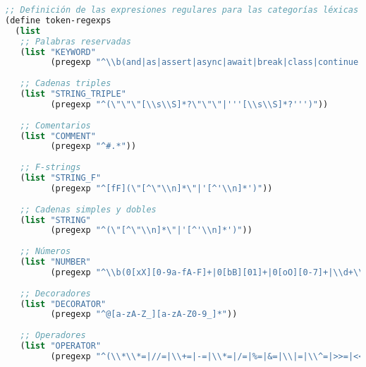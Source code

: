 \documentclass[12pt,letterpaper]{report}
\begin{document}
\begin{lstlisting}[language=Lisp]
;; Definición de las expresiones regulares para las categorías léxicas
(define token-regexps
  (list
   ;; Palabras reservadas
   (list "KEYWORD" 
         (pregexp "^\\b(and|as|assert|async|await|break|class|continue|def|del|elif|else|except|False|finally|for|from|global|if|import|in|is|lambda|None|nonlocal|not|or|pass|raise|return|True|try|while|with|yield)\\b"))
   
   ;; Cadenas triples
   (list "STRING_TRIPLE" 
         (pregexp "^(\"\"\"[\\s\\S]*?\"\"\"|'''[\\s\\S]*?''')"))
   
   ;; Comentarios
   (list "COMMENT" 
         (pregexp "^#.*"))
   
   ;; F-strings
   (list "STRING_F" 
         (pregexp "^[fF](\"[^\"\\n]*\"|'[^'\\n]*')"))
   
   ;; Cadenas simples y dobles
   (list "STRING" 
         (pregexp "^(\"[^\"\\n]*\"|'[^'\\n]*')"))
   
   ;; Números
   (list "NUMBER" 
         (pregexp "^\\b(0[xX][0-9a-fA-F]+|0[bB][01]+|0[oO][0-7]+|\\d+\\.\\d*|\\.\\d+|\\d+)([eE][+-]?\\d+)?\\b"))
   
   ;; Decoradores
   (list "DECORATOR" 
         (pregexp "^@[a-zA-Z_][a-zA-Z0-9_]*"))
   
   ;; Operadores
   (list "OPERATOR" 
         (pregexp "^(\\*\\*=|//=|\\+=|-=|\\*=|/=|%=|&=|\\|=|\\^=|>>=|<<=|\\*\\*|//|==|!=|<=|>=|<>|<<|>>|\\+|-|\\*|/|%|\\^|&|\\||~|<|>|=)"))
   

\end{lstlisting}
\end{document}
